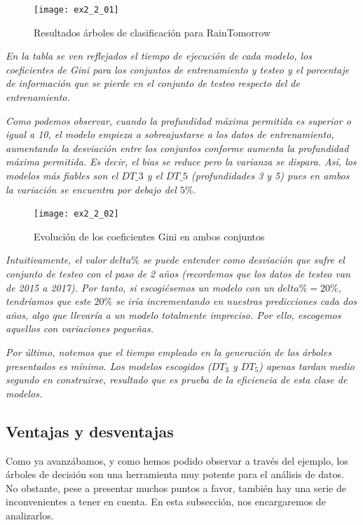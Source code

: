 \documentclass[12pt,twoside]{article}
\begin{document}
\begin{figure}[H]
\centering
\texttt{[image: ex2\_2\_01]}
\caption{Resultados árboles de clasificación para RainTomorrow}
\end{figure}

\emph{En la tabla se ven reflejados el tiempo de ejecución de cada modelo, los coeficientes de Gini para los conjuntos de entrenamiento y testeo y el porcentaje de información que se pierde en el conjunto de testeo respecto del de entrenamiento.}

\emph{Como podemos observar, cuando la profundidad máxima permitida es superior o igual a 10, el modelo empieza a sobreajustarse a los datos de entrenamiento, aumentando la desviación entre los conjuntos conforme aumenta la profundidad máxima permitida. Es decir, el bias se reduce pero la varianza se dispara. Así, los modelos más fiables son el $DT\_3$ y el $DT\_5$ (profundidades 3 y 5) pues en ambos la variación se encuentra por debajo del $5\%$.}

\begin{figure}[h]
\centering
\texttt{[image: ex2\_2\_02]}
\caption{Evolución de los coeficientes Gini en ambos conjuntos}
\end{figure}

\emph{Intuitivamente, el valor $delta\%$ se puede entender como desviación que sufre el conjunto de testeo con el paso de 2 años (recordemos que los datos de testeo van de 2015 a 2017). Por tanto, si escogiésemos un modelo con un $delta\% = 20\%$, tendríamos que este $20\%$ se iría incrementando en nuestras predicciones cada dos años, algo que llevaría a un modelo totalmente impreciso. Por ello, escogemos aquellos con variaciones pequeñas.}

\emph{Por último, notemos que el tiempo empleado en la generación de los árboles presentados es mínimo. Los modelos escogidos ($DT_3$ y $DT_5$) apenas tardan medio segundo en construirse, resultado que es prueba de la eficiencia de esta clase de modelos.}





\subsection{Ventajas y desventajas}
Como ya avanzábamos, y como hemos podido observar a través del ejemplo, los árboles de decisión son una herramienta muy potente para el análisis de datos. No obstante, pese a presentar muchos puntos a favor, también hay una serie de inconvenientes a tener en cuenta. En esta subsección, nos encargaremos de analizarlos.
\end{document}
